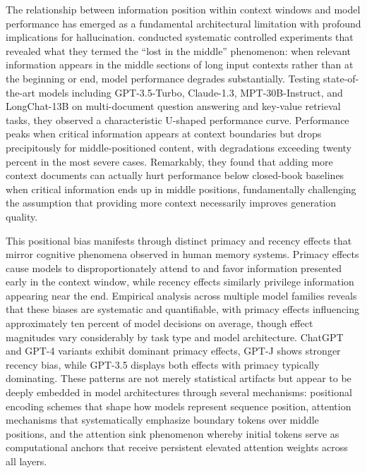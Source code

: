 The relationship between information position within context windows and model performance has emerged as a fundamental architectural limitation with profound implications for hallucination. \citet{liu2024lost} conducted systematic controlled experiments that revealed what they termed the ``lost in the middle'' phenomenon: when relevant information appears in the middle sections of long input contexts rather than at the beginning or end, model performance degrades substantially. Testing state-of-the-art models including GPT-3.5-Turbo, Claude-1.3, MPT-30B-Instruct, and LongChat-13B on multi-document question answering and key-value retrieval tasks, they observed a characteristic U-shaped performance curve. Performance peaks when critical information appears at context boundaries but drops precipitously for middle-positioned content, with degradations exceeding twenty percent in the most severe cases. Remarkably, they found that adding more context documents can actually hurt performance below closed-book baselines when critical information ends up in middle positions, fundamentally challenging the assumption that providing more context necessarily improves generation quality.

This positional bias manifests through distinct primacy and recency effects that mirror cognitive phenomena observed in human memory systems. Primacy effects cause models to disproportionately attend to and favor information presented early in the context window, while recency effects similarly privilege information appearing near the end. Empirical analysis across multiple model families reveals that these biases are systematic and quantifiable, with primacy effects influencing approximately ten percent of model decisions on average, though effect magnitudes vary considerably by task type and model architecture. ChatGPT and GPT-4 variants exhibit dominant primacy effects, GPT-J shows stronger recency bias, while GPT-3.5 displays both effects with primacy typically dominating. These patterns are not merely statistical artifacts but appear to be deeply embedded in model architectures through several mechanisms: positional encoding schemes that shape how models represent sequence position, attention mechanisms that systematically emphasize boundary tokens over middle positions, and the attention sink phenomenon whereby initial tokens serve as computational anchors that receive persistent elevated attention weights across all layers.

